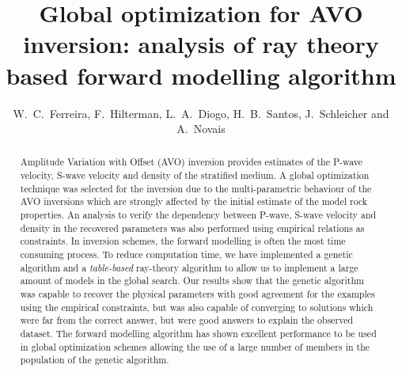 \documentclass{vie16}
\begin{document}
\title{Global optimization for AVO inversion: analysis of ray
theory based forward modelling algorithm}
\author{W.~C.~Ferreira, F.~Hilterman, L.~A.~Diogo, H.~B.~Santos,
J.~Schleicher and A.~Novais}
\maketitle

\begin{abstract}
Amplitude Variation with Offset (AVO) inversion provides
estimates of the P-wave velocity, S-wave velocity and density of
the stratified medium. A global optimization technique was
selected for the inversion due to the multi-parametric behaviour
of the AVO inversions which are strongly affected by the initial
estimate of the model rock properties.  An analysis to verify
the dependency between P-wave, S-wave velocity and density in
the recovered parameters was also performed using empirical
relations as constraints. In inversion schemes, the forward
modelling is often the most time consuming process. To reduce
computation time, we have implemented a genetic algorithm and a
\textit{table-based} ray-theory algorithm to allow us to
implement a large amount of models in the global search. Our
results show that the genetic algorithm was capable to recover
the physical parameters with good agreement for the examples
using the empirical constraints, but was also capable of
converging to solutions which were far from the correct answer,
but were good answers to explain the observed dataset. The
forward modelling algorithm has shown excellent performance to
be used in global optimization schemes allowing the use of a
large number of members in the population of the genetic
algorithm.
\end{abstract}

\newpage
\end{document}
